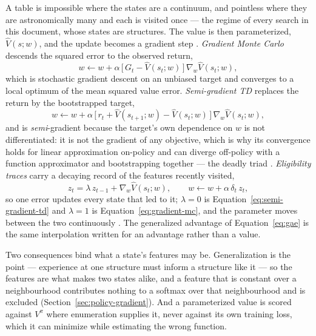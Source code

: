 \documentclass[11pt,a4paper]{article}
\begin{document}
A table is impossible where the states are a continuum, and pointless where
they are astronomically many and each is visited once --- the regime of every
search in this document, whose states are structures. The value is then
parameterized, $\hat{V}(s; w)$, and the update becomes a gradient step
\citep[Ch.~9]{suttonbarto2018}. \emph{Gradient Monte Carlo} descends the
squared error to the observed return,
\begin{equation}
  w \gets w + \alpha\,\big[\, G_t - \hat{V}(s_t; w) \,\big]\,
    \nabla_w \hat{V}(s_t; w),
  \label{eq:gradient-mc}
\end{equation}
which is stochastic gradient descent on an unbiased target and converges to a
local optimum of the mean squared value error. \emph{Semi-gradient TD}
replaces the return by the bootstrapped target,
\begin{equation}
  w \gets w + \alpha\,\big[\, r_t + \hat{V}(s_{t+1}; w) - \hat{V}(s_t; w) \,\big]\,
    \nabla_w \hat{V}(s_t; w),
  \label{eq:semi-gradient-td}
\end{equation}
and is \emph{semi}-gradient because the target's own dependence on $w$ is not
differentiated: it is not the gradient of any objective, which is why its
convergence holds for linear approximation on-policy and can diverge off-policy
with a function approximator and bootstrapping together --- the deadly triad
\citep[Ch.~11]{suttonbarto2018}. \emph{Eligibility traces} carry a decaying
record of the features recently visited,
\begin{equation}
  z_t = \lambda\, z_{t-1} + \nabla_w \hat{V}(s_t; w),
  \qquad
  w \gets w + \alpha\,\delta_t\, z_t,
  \label{eq:eligibility}
\end{equation}
so one error updates every state that led to it; $\lambda = 0$ is
Equation~\ref{eq:semi-gradient-td} and $\lambda = 1$ is
Equation~\ref{eq:gradient-mc}, and the parameter moves between the two
continuously \citep[Ch.~12]{suttonbarto2018}. The generalized advantage of
Equation~\ref{eq:gae} is the same interpolation written for an advantage
rather than a value.

Two consequences bind what a state's features may be. Generalization is the
point --- experience at one structure must inform a structure like it --- so
the features are what makes two states alike, and a feature that is constant
over a neighbourhood contributes nothing to a softmax over that neighbourhood
and is excluded (Section~\ref{sec:policy-gradient}). And a parameterized value
is scored against $V^{\pi}$ where enumeration supplies it, never against its own
training loss, which it can minimize while estimating the wrong function.
\end{document}
